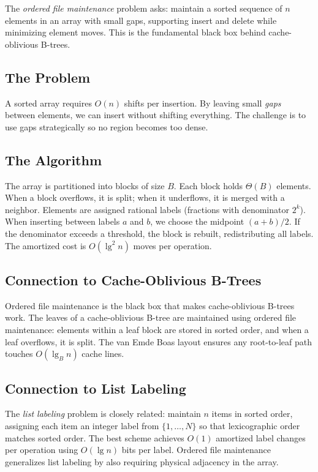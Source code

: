 The \emph{ordered file maintenance} problem asks: maintain a sorted sequence of $n$ elements in an array with small gaps, supporting insert and delete while minimizing element moves. This is the fundamental black box behind cache-oblivious B-trees.

\subsection{The Problem}

A sorted array requires $O(n)$ shifts per insertion. By leaving small \emph{gaps} between elements, we can insert without shifting everything. The challenge is to use gaps strategically so no region becomes too dense.

\subsection{The Algorithm}

The array is partitioned into blocks of size $B$. Each block holds $\Theta(B)$ elements. When a block overflows, it is split; when it underflows, it is merged with a neighbor. Elements are assigned rational labels (fractions with denominator $2^k$). When inserting between labels $a$ and $b$, we choose the midpoint $(a+b)/2$. If the denominator exceeds a threshold, the block is rebuilt, redistributing all labels. The amortized cost is $O(\lg^2 n)$ moves per operation.

\subsection{Connection to Cache-Oblivious B-Trees}

Ordered file maintenance is the black box that makes cache-oblivious B-trees work. The leaves of a cache-oblivious B-tree are maintained using ordered file maintenance: elements within a leaf block are stored in sorted order, and when a leaf overflows, it is split. The van Emde Boas layout ensures any root-to-leaf path touches $O(\lg_B n)$ cache lines.

\subsection{Connection to List Labeling}

The \emph{list labeling} problem is closely related: maintain $n$ items in sorted order, assigning each item an integer label from $\{1, \ldots, N\}$ so that lexicographic order matches sorted order. The best scheme achieves $O(1)$ amortized label changes per operation using $O(\lg n)$ bits per label. Ordered file maintenance generalizes list labeling by also requiring physical adjacency in the array.

